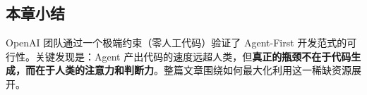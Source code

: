 \subsection{本章小结}

OpenAI 团队通过一个极端约束（零人工代码）验证了 Agent-First 开发范式的可行性。关键发现是：Agent 产出代码的速度远超人类，但\textbf{真正的瓶颈不在于代码生成，而在于人类的注意力和判断力}。整篇文章围绕如何最大化利用这一稀缺资源展开。

\newpage

